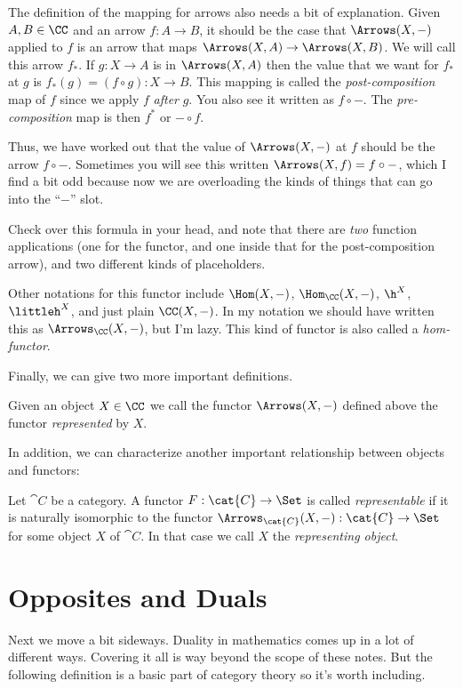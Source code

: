 The definition of the mapping for arrows also needs a bit of explanation. Given $A,B \in
\CC$ and an arrow $f: A \to B$, it should be the case that $\Arrows(X,-)$ applied to $f$
is an arrow that maps $\Arrows(X,A) \to \Arrows(X,B)$. We will call this arrow $f_*$. If
$g: X \to A$ is in $\Arrows(X,A)$ then the value that we want for $f_*$ at $g$ is $f_*(g)
= (f \circ g): X \to B$. This mapping is called the {\it post-composition} map of $f$
since we apply $f$ {\it after} $g$. You also see it written as $f \circ -$. The {\it
pre-composition} map is then $f^*$ or $- \circ f$.

Thus, we have worked out that the value of $\Arrows(X,-)$ at $f$ should be the arrow $f
\circ -$. Sometimes you will see this written $\Arrows(X, f) = f \circ -$, which I find a
bit odd because now we are overloading the kinds of things that can go into the ``$-$''
slot.

Check over this formula in your head, and note that there are {\it two} function
applications (one for the functor, and one inside that for the post-composition arrow),
and two different kinds of placeholders.

Other notations for this functor include $\Hom(X, -)$, $\Hom_\CC(X, -)$, $\h^X$, ${\littleh}^X$, and
just plain $\CC(X,-)$. In my notation we should have written this as $\Arrows_{\CC}(X,
-)$, but I'm lazy. This kind of functor is also called a {\it hom-functor}.

Finally, we can give two more important definitions.
\begin{defn}
\label{represented}
Given an object $X \in \CC$ we call the functor $\Arrows(X,-)$ defined above the functor
{\it represented} by $X$.
\end{defn}
\noindent
In addition, we can characterize another important relationship between objects and
functors:

\begin{defn}
 Let $\cat{C}$ be a category. A functor $F:\cat{C}\to\Set$ is called \emph{representable}
 if it is naturally isomorphic to the functor $\Arrows_\cat{C}(X,-):\cat{C}\to\Set$ for
 some object $X$ of $\cat{C}$. In that case we call $X$ the \emph{representing object}. 
\end{defn}

\section{Opposites and Duals}

Next we move a bit sideways. Duality in mathematics comes up in
a lot of different ways. Covering it all is way beyond the scope of these notes. But the
following definition is a basic part of category theory so it's worth including.

